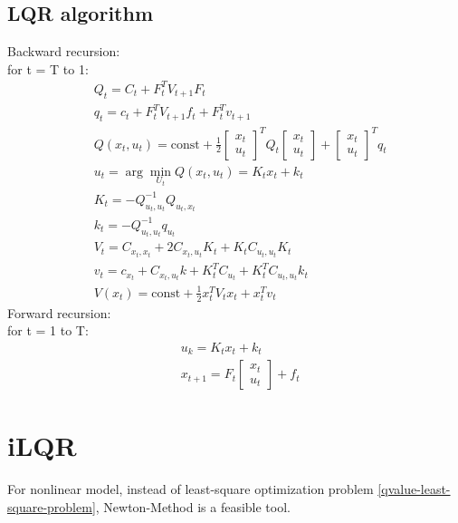 \documentclass{article}
\begin{document}
\subsection{LQR algorithm}
Backward recursion:\\
{\setlength{\indent}
for t = T to 1:
\begin{align*}
    & Q_t = C_t + F_t^T V_{t + 1} F_t\\
    & q_t = c_t + F_t^TV_{t + 1}f_t + F_t^Tv_{t + 1}\\
    & Q(x_t, u_t) = \text{const} + \frac{1}{2}\begin{bmatrix}
        x_t\\u_t
    \end{bmatrix}^T Q_t \begin{bmatrix}
        x_t\\u_t
    \end{bmatrix} + \begin{bmatrix}
        x_t\\u_t
    \end{bmatrix}^T q_t\\
    & u_t = \arg\min_{U_t}{Q(x_t, u_t)} = K_tx_t + k_t\\
    & K_t = -Q_{u_t, u_t}^{-1}Q_{u_t, x_t}\\
    & k_t = -Q_{u_t, u_t}^{-1}q_{u_t}\\
    & V_t = C_{x_t, x_t} + 2C_{x_t, u_t}K_t + K_tC_{u_t, u_t}K_t\\
    & v_t = c_{x_t} + C_{x_t, u_t}k + K_t^TC_{u_t} + K_t^TC_{u_t, u_t}k_t\\
    & V(x_t) = \text{const} + \frac{1}{2}x_t^TV_tx_t + x_t^Tv_t
\end{align*}
}
Forward recursion:\\
{\setlength{\indent}{}
for t = 1 to T:
\begin{align*}
    & u_k = K_tx_t+k_t\\
    & x_{t + 1} = F_t\begin{bmatrix}
        x_t\\u_t
    \end{bmatrix} + f_t
\end{align*}
}

\section{iLQR}
For nonlinear model, instead of least-square optimization problem \eqref{qvalue-least-square-problem}, Newton-Method is a feasible tool.
\end{document}
